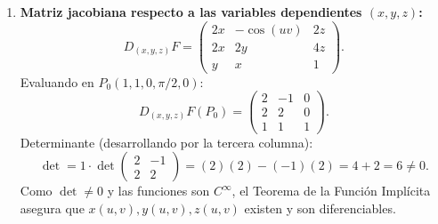 \documentclass[11pt,a4paper]{article}
\begin{document}
\begin{enumerate}[label=\textbf{\arabic*.}]
\item \textbf{Matriz jacobiana respecto a las variables dependientes $(x,y,z)$:}
\begin{equation*}
D_{(x,y,z)}F = \begin{pmatrix} 2x & -\cos(uv) & 2z \\ 2x & 2y & 4z \\ y & x & 1 \end{pmatrix}.
\end{equation*}
Evaluando en $P_0(1,1,0,\pi/2,0)$:
\begin{equation*}
D_{(x,y,z)}F(P_0) = \begin{pmatrix} 2 & -1 & 0 \\ 2 & 2 & 0 \\ 1 & 1 & 1 \end{pmatrix}.
\end{equation*}
Determinante (desarrollando por la tercera columna):
\begin{equation*}
\det = 1 \cdot \det\begin{pmatrix} 2 & -1 \\ 2 & 2 \end{pmatrix} = (2)(2) - (-1)(2) = 4 + 2 = 6 \neq 0.
\end{equation*}
Como $\det \neq 0$ y las funciones son $C^\infty$, el Teorema de la Función Implícita asegura que $x(u,v), y(u,v), z(u,v)$ existen y son diferenciables.
\end{enumerate}
\end{document}

